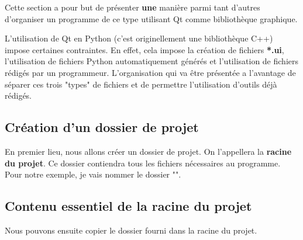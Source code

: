 Cette section a pour but de présenter \textbf{une} manière parmi tant d'autres d'organiser un programme de ce type utilisant Qt comme bibliothèque graphique.

L'utilisation de Qt en Python (c'est originellement une bibliothèque C++) impose certaines contraintes. En effet, cela impose la création de fichiers \textbf{*.ui}, l'utilisation de fichiers Python automatiquement générés et l'utilisation de fichiers rédigés par un programmeur.\newline
L'organisation qui va être présentée a l'avantage de séparer ces trois "types" de fichiers et de permettre l'utilisation d'outils déjà rédigés.

\subsection{Création d'un dossier de projet}

En premier lieu, nous allons créer un dossier de projet. On l'appellera la \textbf{racine du projet}. Ce dossier contiendra tous les fichiers nécessaires au programme.\newline
Pour notre exemple, je vais nommer le dossier "".\newline

\subsection{Contenu essentiel de la racine du projet}

Nous pouvons ensuite copier le dossier  fourni dans la racine du projet.\newline

